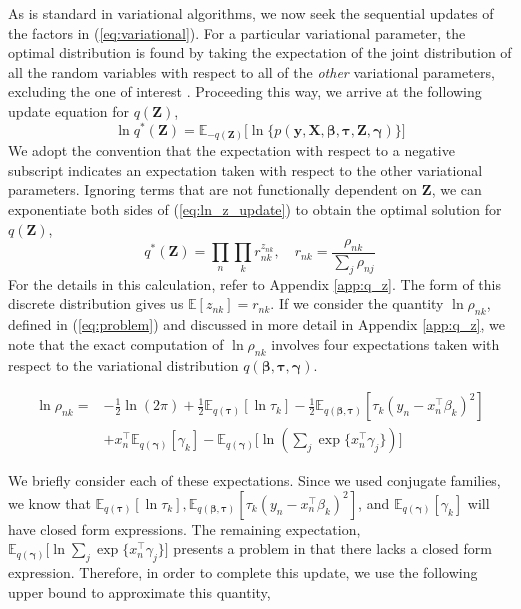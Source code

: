 \documentclass[twoside,11pt]{article}
\newcommand{\tr}{\intercal}
\newcommand{\boldbeta}{\boldsymbol\beta}
\newcommand{\boldgamma}{\boldsymbol\gamma}
\newcommand{\boldtau}{\boldsymbol\tau}
\newcommand{\E}{\mathbb{E}}
\newcommand{\pr}[1]{p \left( #1 \right)}
\begin{document}
As is standard in variational algorithms, we now seek the sequential updates of the factors in (\ref{eq:variational}). For a particular variational parameter, the optimal distribution is found by taking the expectation of the joint distribution of all the random variables with respect to all of the \textit{other} variational parameters, excluding the one of interest \parencite{bishop:06}. Proceeding this way, we arrive at the following update equation for $q(\mathbf{Z})$,
\begin{equation} \label{eq:ln_z_update}
	\ln q^{*}(\mathbf{Z}) = \E_{-q(\mathbf{Z})} \Big[ \ln \big\{ \pr{\mathbf{y}, \mathbf{X}, \boldbeta, \boldtau, \mathbf{Z}, \boldgamma} \big\} \Big]
\end{equation}
We adopt the convention that the expectation with respect to a negative subscript indicates an expectation taken with respect to the other variational parameters. Ignoring terms that are not functionally dependent on $\mathbf{Z}$, we can exponentiate both sides of (\ref{eq:ln_z_update}) to obtain the optimal solution for $q(\mathbf{Z})$,
\begin{equation} \label{optimal_z}
	 q^{*}(\mathbf{Z}) = \prod_{n} \prod_{k} r_{nk}^{z_{nk}}, \quad r_{nk} = \frac{\rho_{nk}}{\sum_{j} \rho_{nj}}
\end{equation}
For the details in this calculation, refer to Appendix \ref{app:q_z}. The form of this discrete distribution gives us $\E[z_{nk}] = r_{nk}$. If we consider the quantity $\ln \rho_{nk}$, defined in (\ref{eq:problem}) and discussed in more detail in Appendix \ref{app:q_z}, we note that the exact computation of $\ln \rho_{nk}$ involves four expectations taken with respect to the variational distribution $q(\boldbeta, \boldtau, \boldgamma)$. 

\begin{equation} \label{eq:problem}
\begin{split}
 \ln \rho_{nk} = &-\frac{1}{2}\ln(2\pi) + \frac{1}{2} \E_{q(\boldsymbol\tau)}[ \ln \tau_k ] - \frac{1}{2} \E_{q(\boldsymbol\beta, \boldsymbol\tau)}[\tau_k (y_n - x_n^{\tr}\beta_k)^2] \\ 
	& + x_n^{\tr}\E_{q(\boldsymbol\gamma)}[\gamma_k] - \E_{q(\boldsymbol\gamma)}\Bigg[\ln \left( \sum_{j} \exp \{ x_n^{\tr} \gamma_j \}\right)\Bigg]
\end{split}
\end{equation}

We briefly consider each of these expectations. Since we used conjugate families, we know that $\E_{q(\boldsymbol\tau)}[ \ln \tau_k ], \E_{q(\boldsymbol\beta, \boldsymbol\tau)}[\tau_k (y_n - x_n^{\tr}\beta_k)^2]$, and $\E_{q(\boldsymbol\gamma)}[\gamma_k]$ will have closed form expressions. The remaining expectation, 
$\E_{q(\boldsymbol\gamma)}\big[\ln \sum_{j} \exp \{ x_n^{\tr} \gamma_j \} \big]$ presents a problem in that there lacks a closed form expression. Therefore, in order to complete this update, we use the following upper bound to approximate this quantity,
\end{document}
